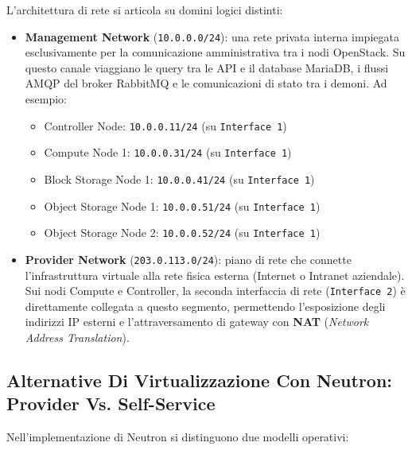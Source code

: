\documentclass[11pt, a4paper]{article}
\begin{document}
L'architettura di rete si articola su domini logici distinti:
\begin{itemize}
    \item \textbf{Management Network} (\texttt{10.0.0.0/24}): una rete privata interna impiegata esclusivamente per la comunicazione amministrativa tra i nodi OpenStack. Su questo canale viaggiano le query tra le API e il database MariaDB, i flussi AMQP del broker RabbitMQ e le comunicazioni di stato tra i demoni.
    Ad esempio:
    \begin{itemize}[noitemsep]
        \item Controller Node: \texttt{10.0.0.11/24} (su \texttt{Interface 1})
        \item Compute Node 1: \texttt{10.0.0.31/24} (su \texttt{Interface 1})
        \item Block Storage Node 1: \texttt{10.0.0.41/24} (su \texttt{Interface 1})
        \item Object Storage Node 1: \texttt{10.0.0.51/24} (su \texttt{Interface 1})
        \item Object Storage Node 2: \texttt{10.0.0.52/24} (su \texttt{Interface 1})
    \end{itemize}
    \item \textbf{Provider Network} (\texttt{203.0.113.0/24}): piano di rete che connette l'infrastruttura virtuale alla rete fisica esterna (Internet o Intranet aziendale). Sui nodi Compute e Controller, la seconda interfaccia di rete (\texttt{Interface 2}) è direttamente collegata a questo segmento, permettendo l'esposizione degli indirizzi IP esterni e l'attraversamento di gateway con \textbf{NAT} (\emph{Network Address Translation}).
\end{itemize}

\subsection{Alternative Di Virtualizzazione Con Neutron: Provider Vs. Self-Service}

Nell'implementazione di Neutron si distinguono due modelli operativi:
\end{document}
